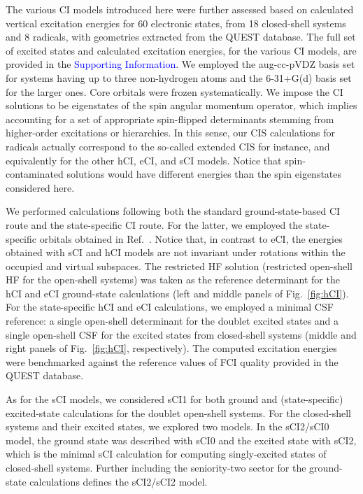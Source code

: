 \documentclass[aip,jcp,reprint,noshowkeys,superscriptaddress]{revtex4-1}
\newcommand{\SupInf}{\textcolor{blue}{Supporting Information}}
\begin{document}
The various CI models introduced here were further assessed based on calculated vertical excitation energies for 60 electronic states,
from 18 closed-shell systems and 8 radicals, with geometries extracted from the QUEST database. \cite{Veril_2021}
The full set of excited states and calculated excitation energies, for the various CI models, are provided in the {\SupInf}.
We employed the aug-cc-pVDZ basis set for systems having up to three non-hydrogen atoms and the 6-31+G(d) basis set for the larger ones.
Core orbitals were frozen systematically.
We impose the CI solutions to be eigenstates of the spin angular momentum operator, which implies accounting for a set of appropriate spin-flipped determinants stemming from higher-order excitations or hierarchies. \cite{Chilkuri_2021}
In this sense, our CIS calculations for radicals actually correspond to the so-called extended CIS \cite{Maurice_1996} for instance, and equivalently for the other hCI, eCI, and sCI models.
Notice that spin-contaminated solutions would have different energies than the spin eigenstates considered here.

We performed calculations following both the standard ground-state-based CI route and the state-specific CI route. \cite{Kossoski_2023}
For the latter, we employed the state-specific orbitals obtained in Ref.~.
Notice that, in contrast to eCI, the energies obtained with sCI and hCI models are not invariant under rotations within the occupied and virtual subspaces.
The restricted HF solution (restricted open-shell HF for the open-shell systems) was taken as the reference determinant for the hCI and eCI ground-state calculations
(left and middle panels of Fig.~\ref{fig:hCI}).
For the state-specific hCI and eCI calculations, we employed a minimal CSF reference: \cite{Kossoski_2023}
a single open-shell determinant for the doublet excited states and a single open-shell CSF for the excited states from closed-shell systems
(middle and right panels of Fig.~\ref{fig:hCI}, respectively).
The computed excitation energies were benchmarked against the reference values of FCI quality provided in the QUEST database. \cite{Veril_2021}

As for the sCI models,
we considered sCI1 for both ground and (state-specific) excited-state calculations for the doublet open-shell systems.
For the closed-shell systems and their excited states, we explored two models.
In the sCI2/sCI0 model, the ground state was described with sCI0 and the excited state with sCI2, which is the minimal sCI calculation for computing singly-excited states of closed-shell systems.
Further including the seniority-two sector for the ground-state calculations defines the sCI2/sCI2 model.
\end{document}
